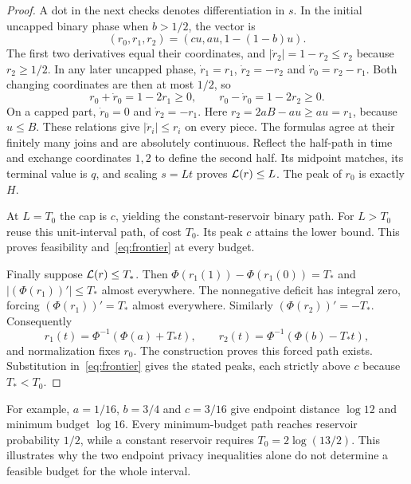 \begin{proof}
A dot in the next checks denotes differentiation in $s$. In the initial uncapped binary phase when $b>1/2$, the vector is
\[
 (r_0,r_1,r_2)=(cu,au,1-(1-b)u).
\]
The first two derivatives equal their coordinates, and $|\dot r_2|=1-r_2\le r_2$ because $r_2\ge1/2$. In any later uncapped phase,
$\dot r_1=r_1$, $\dot r_2=-r_2$ and $\dot r_0=r_2-r_1$. Both changing coordinates are then at most $1/2$, so
\[
 r_0+\dot r_0=1-2r_1\ge0,\qquad
 r_0-\dot r_0=1-2r_2\ge0.
\]
On a capped part, $\dot r_0=0$ and $\dot r_2=-r_1$. Here
$r_2=2aB-au\ge au=r_1$, because $u\le B$. These relations give $|\dot r_i|\le r_i$ on every piece. The formulas agree at their finitely many joins and are absolutely continuous. Reflect the half-path in time and exchange coordinates $1,2$ to define the second half. Its midpoint matches, its terminal value is $q$, and scaling $s=Lt$ proves $\mathcal L(r)\le L$. The peak of $r_0$ is exactly $H$.

At $L=T_0$ the cap is $c$, yielding the constant-reservoir binary path. For $L>T_0$ reuse this unit-interval path, of cost $T_0$. Its peak $c$ attains the lower bound. This proves feasibility and~\eqref{eq:frontier} at every budget.

Finally suppose $\mathcal L(r)\le T_*$. Then
$\Phi(r_1(1))-\Phi(r_1(0))=T_*$ and $|(\Phi(r_1))'|\le T_*$ almost everywhere. The nonnegative deficit has integral zero, forcing $(\Phi(r_1))'=T_*$ almost everywhere. Similarly $(\Phi(r_2))'=-T_*$. Consequently
\[
 r_1(t)=\Phi^{-1}(\Phi(a)+T_*t),\qquad
 r_2(t)=\Phi^{-1}(\Phi(b)-T_*t),
\]
and normalization fixes $r_0$. The construction proves this forced path exists. Substitution in~\eqref{eq:frontier} gives the stated peaks, each strictly above $c$ because $T_*<T_0$.
\end{proof}

For example, $a=1/16$, $b=3/4$ and $c=3/16$ give endpoint distance $\log12$ and minimum budget $\log16$. Every minimum-budget path reaches reservoir probability $1/2$, while a constant reservoir requires $T_0=2\log(13/2)$. This illustrates why the two endpoint privacy inequalities alone do not determine a feasible budget for the whole interval.

